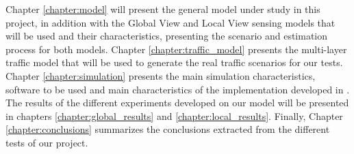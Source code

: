 Chapter \ref{chapter:model} will present the general model under study in this project, in addition with the Global View and Local View sensing models that will be used and their characteristics, presenting the scenario and estimation process for both models. Chapter \ref{chapter:traffic_model} presents the multi-layer traffic model that will be used to generate the real traffic scenarios for our tests. Chapter \ref{chapter:simulation} presents the main simulation characteristics, software to be used and main characteristics of the implementation developed in \cite{marcello-thesis}. The results of the different experiments developed on our model will be presented in chapters \ref{chapter:global_results} and \ref{chapter:local_results}. Finally, Chapter \ref{chapter:conclusions} summarizes the conclusions extracted from the different tests of our project.